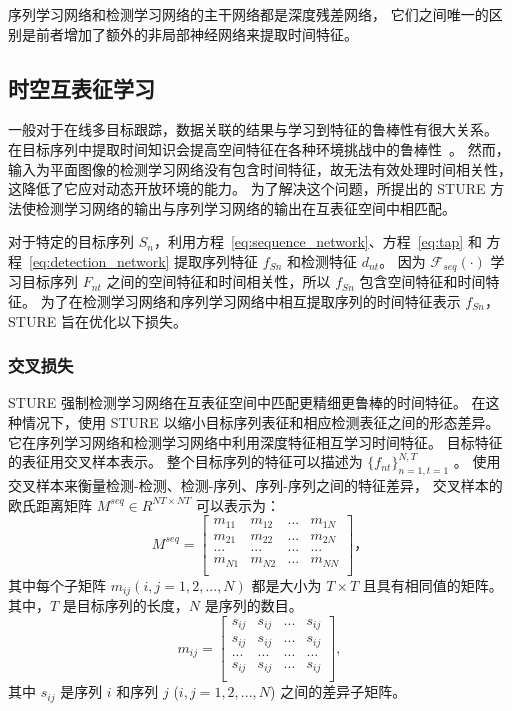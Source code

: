 序列学习网络和检测学习网络的主干网络都是深度残差网络，
它们之间唯一的区别是前者增加了额外的非局部神经网络来提取时间特征。


\subsection{时空互表征学习}
一般对于在线多目标跟踪，数据关联的结果与学习到特征的鲁棒性有很大关系。
在目标序列中提取时间知识会提高空间特征在各种环境挑战中的鲁棒性~\cite{RN986}。
然而，输入为平面图像的检测学习网络没有包含时间特征，故无法有效处理时间相关性，这降低了它应对动态开放环境的能力。
为了解决这个问题，所提出的 STURE 方法使检测学习网络的输出与序列学习网络的输出在互表征空间中相匹配。

对于特定的目标序列 $S_n$，利用方程~\ref{eq:sequence_network}、方程~\ref{eq:tap} 和 方程~\ref{eq:detection_network} 提取序列特征 $f_{ Sn}$ 和检测特征 $d_{nt}$。
因为 $\mathcal{F}_{seq}(\cdot)$ 学习目标序列 $F_{nt}$ 之间的空间特征和时间相关性，所以 $f_{Sn}$ 包含空间特征和时间特征。
为了在检测学习网络和序列学习网络中相互提取序列的时间特征表示 $f_{Sn}$，STURE 旨在优化以下损失。


\subsubsection{交叉损失}
STURE 强制检测学习网络在互表征空间中匹配更精细更鲁棒的时间特征。
在这种情况下，使用 STURE 以缩小目标序列表征和相应检测表征之间的形态差异。
它在序列学习网络和检测学习网络中利用深度特征相互学习时间特征。
目标特征的表征用交叉样本表示。
整个目标序列的特征可以描述为 $\{f_{nt}\}_{n=1,t=1}^{N,T}$ 。
使用交叉样本来衡量检测-检测、检测-序列、序列-序列之间的特征差异，
交叉样本的欧氏距离矩阵 $M^{seq}\in R^{NT\times NT}$ 可以表示为：
\begin{equation}\label{eq:m_seq}
M^{seq}={
	\left[ \begin{array}{cccc}
	m_{11} & m_{12} & ... & m_{1N}\\
	m_{21} & m_{22} & ... & m_{2N}\\
	... & ... & ... & ... \\
	m_{N1} & m_{N2} & ... & m_{NN}\\
	\end{array} 
	\right ]}\mbox{，}
\end{equation}
其中每个子矩阵 $m_{ij} (i,j=1,2,...,N)$ 都是大小为 $T \times T$ 且具有相同值的矩阵。
其中，$T$ 是目标序列的长度，$N$ 是序列的数目。
\begin{equation}\label{eq:m_ij}
m_{ij}={
	\left[ \begin{array}{cccc}
	s_{ij} & s_{ij} & ... & s_{ij}\\
	s_{ij} & s_{ij} & ... & s_{ij}\\
	... & ... & ... & ... \\
	s_{ij} & s_{ij} & ... & s_{ij}\\
	\end{array} 
	\right ]},
\end{equation}
其中 $s_{ij}$ 是序列 $i$ 和序列 $j$ ($i,j=1,2,...,N$) 之间的差异子矩阵。

